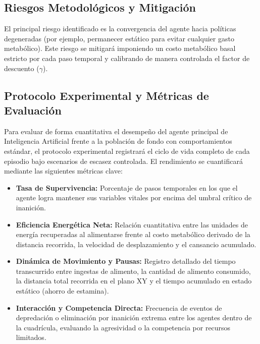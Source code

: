 \documentclass[conference]{IEEEtran}
\begin{document}
\subsection{Riesgos Metodológicos y Mitigación}
El principal riesgo identificado es la convergencia del agente hacia políticas 
degeneradas (por ejemplo, permanecer estático para evitar cualquier gasto 
metabólico). Este riesgo se mitigará imponiendo un costo metabólico basal 
estricto por cada paso temporal y calibrando de manera controlada el factor de 
descuento ($\gamma$).

\subsection{Protocolo Experimental y Métricas de Evaluación}
Para evaluar de forma cuantitativa el desempeño del agente principal de 
Inteligencia Artificial frente a la población de fondo con comportamientos 
estándar, el protocolo experimental registrará el ciclo de vida completo de 
cada episodio bajo escenarios de escasez controlada. El rendimiento se 
cuantificará mediante las siguientes métricas clave:
\begin{itemize}
    \item \textbf{Tasa de Supervivencia:} Porcentaje de pasos temporales en los 
    que el agente logra mantener sus variables vitales por encima del umbral 
    crítico de inanición.
    \item \textbf{Eficiencia Energética Neta:} Relación cuantitativa entre 
    las unidades de energía recuperadas al alimentarse frente al costo 
    metabólico derivado de la distancia recorrida, la velocidad de 
    desplazamiento y el cansancio acumulado.
    \item \textbf{Dinámica de Movimiento y Pausas:} Registro detallado del 
    tiempo transcurrido entre ingestas de alimento, la cantidad de alimento 
    consumido, la distancia total recorrida en el plano XY y el tiempo acumulado 
    en estado estático (ahorro de estamina).
    \item \textbf{Interacción y Competencia Directa:} Frecuencia de eventos de 
    depredación o eliminación por inanición extrema entre los agentes dentro 
    de la cuadrícula, evaluando la agresividad o la competencia por recursos 
    limitados.
\end{itemize}

\end{document}
